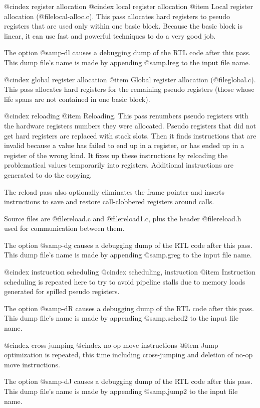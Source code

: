 @cindex register allocation
@cindex local register allocation
@item
Local register allocation (@file{local-alloc.c}).  This pass allocates
hard registers to pseudo registers that are used only within one basic
block.  Because the basic block is linear, it can use fast and
powerful techniques to do a very good job.

The option @samp{-dl} causes a debugging dump of the RTL code after
this pass.  This dump file's name is made by appending @samp{.lreg} to
the input file name.

@cindex global register allocation
@item
Global register allocation (@file{global.c}).  This pass
allocates hard registers for the remaining pseudo registers (those
whose life spans are not contained in one basic block).

@cindex reloading
@item
Reloading.  This pass renumbers pseudo registers with the hardware
registers numbers they were allocated.  Pseudo registers that did not
get hard registers are replaced with stack slots.  Then it finds
instructions that are invalid because a value has failed to end up in
a register, or has ended up in a register of the wrong kind.  It fixes
up these instructions by reloading the problematical values
temporarily into registers.  Additional instructions are generated to
do the copying.

The reload pass also optionally eliminates the frame pointer and inserts
instructions to save and restore call-clobbered registers around calls.

Source files are @file{reload.c} and @file{reload1.c}, plus the header
@file{reload.h} used for communication between them.

The option @samp{-dg} causes a debugging dump of the RTL code after
this pass.  This dump file's name is made by appending @samp{.greg} to
the input file name.

@cindex instruction scheduling
@cindex scheduling, instruction
@item
Instruction scheduling is repeated here to try to avoid pipeline stalls
due to memory loads generated for spilled pseudo registers.

The option @samp{-dR} causes a debugging dump of the RTL code after
this pass.  This dump file's name is made by appending @samp{.sched2}
to the input file name.

@cindex cross-jumping
@cindex no-op move instructions
@item
Jump optimization is repeated, this time including cross-jumping
and deletion of no-op move instructions.

The option @samp{-dJ} causes a debugging dump of the RTL code after
this pass.  This dump file's name is made by appending @samp{.jump2}
to the input file name.

